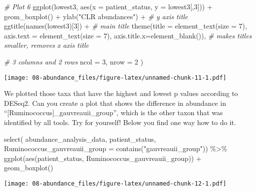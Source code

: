 \documentclass[
  oneside]{book}
\newenvironment{Shaded}{\begin{snugshade}}{\end{snugshade}}
\newcommand{\AttributeTok}[1]{\textcolor[rgb]{0.77,0.63,0.00}{#1}}
\newcommand{\CommentTok}[1]{\textcolor[rgb]{0.56,0.35,0.01}{\textit{#1}}}
\newcommand{\DecValTok}[1]{\textcolor[rgb]{0.00,0.00,0.81}{#1}}
\newcommand{\FunctionTok}[1]{\textcolor[rgb]{0.00,0.00,0.00}{#1}}
\newcommand{\NormalTok}[1]{#1}
\newcommand{\SpecialCharTok}[1]{\textcolor[rgb]{0.00,0.00,0.00}{#1}}
\newcommand{\StringTok}[1]{\textcolor[rgb]{0.31,0.60,0.02}{#1}}
\begin{document}
\begin{Shaded}
\begin{Highlighting}[]
  \CommentTok{\# Plot 6}
  \FunctionTok{ggplot}\NormalTok{(lowest3, }\FunctionTok{aes}\NormalTok{(}\AttributeTok{x =}\NormalTok{ patient\_status, }\AttributeTok{y =}\NormalTok{ lowest3[,}\DecValTok{3}\NormalTok{])) }\SpecialCharTok{+} 
    \FunctionTok{geom\_boxplot}\NormalTok{() }\SpecialCharTok{+} 
    \FunctionTok{ylab}\NormalTok{(}\StringTok{"CLR abundances"}\NormalTok{) }\SpecialCharTok{+} \CommentTok{\# y axis title}
    \FunctionTok{ggtitle}\NormalTok{(}\FunctionTok{names}\NormalTok{(lowest3)[}\DecValTok{3}\NormalTok{]) }\SpecialCharTok{+} \CommentTok{\# main title}
    \FunctionTok{theme}\NormalTok{(}\AttributeTok{title =} \FunctionTok{element\_text}\NormalTok{(}\AttributeTok{size =} \DecValTok{7}\NormalTok{),}
          \AttributeTok{axis.text =} \FunctionTok{element\_text}\NormalTok{(}\AttributeTok{size =} \DecValTok{7}\NormalTok{),}
          \AttributeTok{axis.title.x=}\FunctionTok{element\_blank}\NormalTok{()), }\CommentTok{\# makes titles smaller, removes x axis title}
  
  \CommentTok{\# 3 columns and 2 rows}
  \AttributeTok{ncol =} \DecValTok{3}\NormalTok{, }
  \AttributeTok{nrow =} \DecValTok{2}
\NormalTok{)}
\end{Highlighting}
\end{Shaded}

\texttt{[image: 08-abundance\_files/figure-latex/unnamed-chunk-11-1.pdf]}

We plotted those taxa that have the highest and lowest p values according to DESeq2. Can you create a plot that shows the difference in abundance in ``{[}Ruminococcus{]}\_gauvreauii\_group'', which is the other taxon that was identified by all tools. Try for yourself! Below you find one way how to do it.

\begin{Shaded}
\begin{Highlighting}[]
\FunctionTok{select}\NormalTok{(}
\NormalTok{  abundance\_analysis\_data, }
\NormalTok{  patient\_status, }
  \AttributeTok{Ruminococcus\_gauvreauii\_group =} \FunctionTok{contains}\NormalTok{(}\StringTok{"gauvreauii\_group"}\NormalTok{)) }\SpecialCharTok{\%\textgreater{}\%}
  \FunctionTok{ggplot}\NormalTok{(}\FunctionTok{aes}\NormalTok{(patient\_status, Ruminococcus\_gauvreauii\_group)) }\SpecialCharTok{+}
  \FunctionTok{geom\_boxplot}\NormalTok{()}
\end{Highlighting}
\end{Shaded}

\texttt{[image: 08-abundance\_files/figure-latex/unnamed-chunk-12-1.pdf]}
\end{document}
